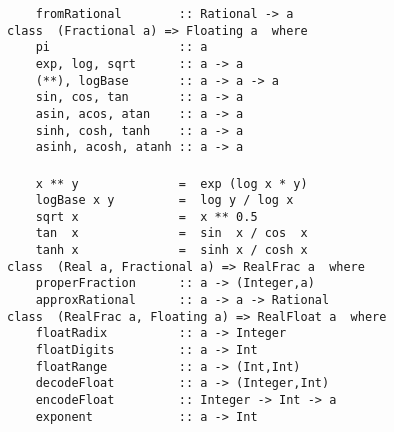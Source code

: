 \mbox{\tt \ \ \ \ fromRational\ \ \ \ \ \ \ \ ::\ Rational\ ->\ a}
\eprogB\noindent\bprogB
\mbox{\tt class\ \ (Fractional\ a)\ =>\ Floating\ a\ \ where}\\
\mbox{\tt \ \ \ \ pi\ \ \ \ \ \ \ \ \ \ \ \ \ \ \ \ \ \ ::\ a}\\
\mbox{\tt \ \ \ \ exp,\ log,\ sqrt\ \ \ \ \ \ ::\ a\ ->\ a}\\
\mbox{\tt \ \ \ \ (**),\ logBase\ \ \ \ \ \ \ ::\ a\ ->\ a\ ->\ a}\\
\mbox{\tt \ \ \ \ sin,\ cos,\ tan\ \ \ \ \ \ \ ::\ a\ ->\ a}\\
\mbox{\tt \ \ \ \ asin,\ acos,\ atan\ \ \ \ ::\ a\ ->\ a}\\
\mbox{\tt \ \ \ \ sinh,\ cosh,\ tanh\ \ \ \ ::\ a\ ->\ a}\\
\mbox{\tt \ \ \ \ asinh,\ acosh,\ atanh\ ::\ a\ ->\ a}\\
\mbox{\tt }\\
\mbox{\tt \ \ \ \ x\ **\ y\ \ \ \ \ \ \ \ \ \ \ \ \ \ =\ \ exp\ (log\ x\ *\ y)}\\
\mbox{\tt \ \ \ \ logBase\ x\ y\ \ \ \ \ \ \ \ \ =\ \ log\ y\ /\ log\ x}\\
\mbox{\tt \ \ \ \ sqrt\ x\ \ \ \ \ \ \ \ \ \ \ \ \ \ =\ \ x\ **\ 0.5}\\
\mbox{\tt \ \ \ \ tan\ \ x\ \ \ \ \ \ \ \ \ \ \ \ \ \ =\ \ sin\ \ x\ /\ cos\ \ x}\\
\mbox{\tt \ \ \ \ tanh\ x\ \ \ \ \ \ \ \ \ \ \ \ \ \ =\ \ sinh\ x\ /\ cosh\ x}
\eprogB\noindent\bprogB
\mbox{\tt class\ \ (Real\ a,\ Fractional\ a)\ =>\ RealFrac\ a\ \ where}\\
\mbox{\tt \ \ \ \ properFraction\ \ \ \ \ \ ::\ a\ ->\ (Integer,a)}\\
\mbox{\tt \ \ \ \ approxRational\ \ \ \ \ \ ::\ a\ ->\ a\ ->\ Rational}
\eprogB\noindent\bprogB
\mbox{\tt class\ \ (RealFrac\ a,\ Floating\ a)\ =>\ RealFloat\ a\ \ where}\\
\mbox{\tt \ \ \ \ floatRadix\ \ \ \ \ \ \ \ \ \ ::\ a\ ->\ Integer}\\
\mbox{\tt \ \ \ \ floatDigits\ \ \ \ \ \ \ \ \ ::\ a\ ->\ Int}\\
\mbox{\tt \ \ \ \ floatRange\ \ \ \ \ \ \ \ \ \ ::\ a\ ->\ (Int,Int)}\\
\mbox{\tt \ \ \ \ decodeFloat\ \ \ \ \ \ \ \ \ ::\ a\ ->\ (Integer,Int)}\\
\mbox{\tt \ \ \ \ encodeFloat\ \ \ \ \ \ \ \ \ ::\ Integer\ ->\ Int\ ->\ a}\\
\mbox{\tt \ \ \ \ exponent\ \ \ \ \ \ \ \ \ \ \ \ ::\ a\ ->\ Int}\\
